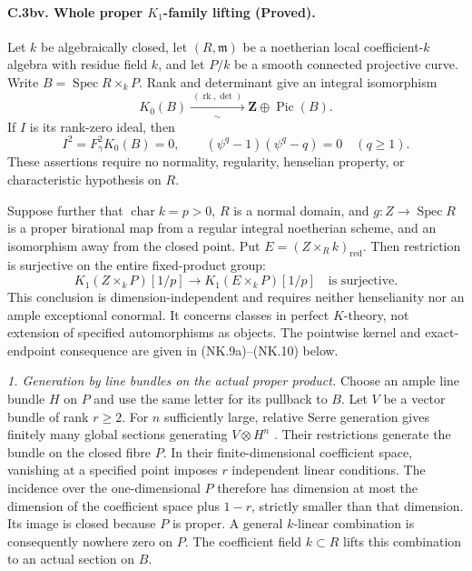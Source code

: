 \paragraph{C.3bv. Whole proper $K_1$-family lifting (Proved).}
Let $k$ be algebraically closed, let $(R,\mathfrak m)$ be a noetherian
local coefficient-$k$ algebra with residue field $k$, and let $P/k$
be a smooth connected projective curve.  Write
$B=\operatorname{Spec}R\times_kP$.  Rank and determinant give an
integral isomorphism
\begin{equation}
 K_0(B)\xrightarrow[\sim]{\ (\operatorname{rk},\det)\ }
                   \mathbf Z\oplus\operatorname{Pic}(B).
                                                        \tag{NK.1}
\end{equation}
If $I$ is its rank-zero ideal, then
\begin{equation}
 I^2=F_\gamma^2K_0(B)=0,\qquad
       (\psi^q-1)(\psi^q-q)=0\quad(q\geq1).
                                                        \tag{NK.2}
\end{equation}
These assertions require no normality, regularity, henselian property,
or characteristic hypothesis on $R$.

Suppose further that $\operatorname{char}k=p>0$, $R$ is a normal
domain, and $g:Z\to\operatorname{Spec}R$ is a proper birational map
from a regular integral noetherian scheme, and an isomorphism away
from the closed point.  Put $E=(Z\times_Rk)_{\mathrm{red}}$.
Then restriction is surjective on the entire fixed-product group:
\begin{equation}
 K_1(Z\times_kP)[1/p]\longrightarrow K_1(E\times_kP)[1/p]
                         \quad\text{is surjective}.
                                                        \tag{NK.7}
\end{equation}
This conclusion is dimension-independent and requires neither
henselianity nor an ample exceptional conormal.  It concerns classes
in perfect $K$-theory, not extension of specified automorphisms as
objects.  The pointwise kernel and exact-endpoint consequence are
given in (NK.9a)--(NK.10) below.

\emph{1. Generation by line bundles on the actual proper product.}
Choose an ample line bundle $H$ on $P$ and use the same letter for
its pullback to $B$.  Let $V$ be a vector bundle of rank $r\geq2$.
For $n$ sufficiently large, relative Serre generation gives finitely
many global sections generating $V\otimes H^n$
\citep[Lemma 30.17.1]{frC3azStacksSerre}.
Their restrictions generate the bundle on the closed fibre $P$.
In their finite-dimensional coefficient space, vanishing at a
specified point imposes $r$ independent linear conditions.  The
incidence over the one-dimensional $P$ therefore has dimension at
most the dimension of the coefficient space plus $1-r$, strictly
smaller than that dimension.  Its image is closed because $P$ is
proper.  A general $k$-linear combination is consequently nowhere
zero on $P$.  The coefficient field $k\subset R$ lifts this
combination to an actual section on $B$.

